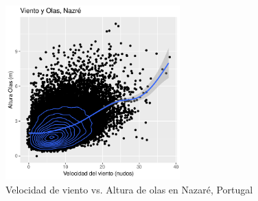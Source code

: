 \begin{figure}[H]
    \centering
    \includegraphics[width=0.6\textwidth]{./figures/nazare_smooth.pdf}
    \caption{Velocidad de viento vs. Altura de olas en Nazaré, Portugal}
    \label{fig:nazare_smooth}
\end{figure}



